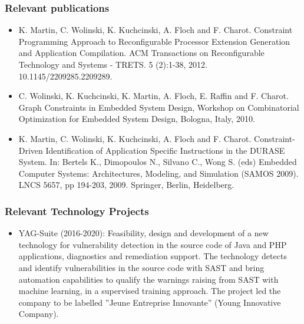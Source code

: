 \documentclass[a4paper,11pt]{article}
\begin{document}
\subsubsection*{Relevant publications}
\begin{itemize}
\item K. Martin, C. Wolinski, K. Kuchcinski, A. Floch and F. Charot. Constraint Programming Approach to Reconfigurable Processor Extension Generation and Application Compilation. ACM Transactions on Reconfigurable Technology and Systems - TRETS. 5 (2):1-38, 2012. 10.1145/2209285.2209289.
\item C. Wolinski, K. Kuchcinski, K. Martin, A. Floch, E. Raffin and F. Charot. Graph Constraints in Embedded System Design, Workshop on Combinatorial Optimization for Embedded System Design, Bologna, Italy, 2010.

\item K. Martin, C. Wolinski, K. Kuchcinski, A. Floch and F. Charot. Constraint-Driven Identification of Application Specific Instructions in the DURASE System. 
In: Bertels K., Dimopoulos N., Silvano C., Wong S. (eds) Embedded Computer Systems: Architectures, Modeling, and Simulation (SAMOS 2009). LNCS 5657, pp 194-203, 2009. Springer, Berlin, Heidelberg.
\end{itemize}




\subsubsection*{Relevant Technology Projects}

\begin{itemize}
\item YAG-Suite (2016-2020): Feasibility, design and development of a new technology for vulnerability detection in the source code of Java and PHP applications, diagnostics and remediation support. The technology detects and identify vulnerabilities in the source code with SAST and bring automation capabilities to qualify the warnings raising from SAST with machine learning, in a supervised training approach. The project led the company to be labelled ”Jeune Entreprise Innovante” (Young Innovative Company).
\end{itemize}

\end{document}
